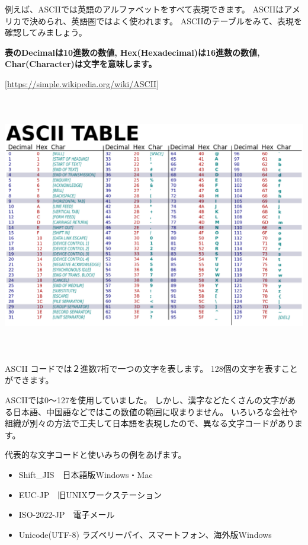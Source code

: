 \documentclass[a4paper,12pt,dvipdfmx]{jarticle}
\begin{document}
例えば、ASCIIでは英語のアルファベットをすべて表現できます。
ASCIIはアメリカで決められ、英語圏ではよく使われます。
ASCIIのテーブルをみて、表現を確認してみましょう。


\bigskip

{\bfseries
表のDecimalは10進数の数値,
Hex(Hexadecimal)は16進数の数値,
Char(Character)は文字を意味します。}


\bigskip

[\url{https://simple.wikipedia.org/wiki/ASCII}]

\begin{center}
\includegraphics[width=17.006cm,height=11.317cm]{textbook-img016.eps}

\end{center}
ASCII
コードでは２進数7桁で一つの文字を表します。
128個の文字を表すことができます。


\bigskip


\bigskip


\bigskip

\clearpage
ASCIIでは0〜127を使用していました。
しかし、漢字などたくさんの文字がある日本語、中国語などではこの数値の範囲に収まりません。
いろいろな会社や組織が別々の方法で工夫して日本語を表現したので、異なる文字コードがあります。

代表的な文字コードと使いみちの例をあげます。

\begin{itemize}
\item Shift\_JIS　日本語版Windows・Mac
\item EUC-JP　旧UNIXワークステーション
\item ISO-2022-JP　電子メール
\item Unicode(UTF-8)
ラズベリーパイ、スマートフォン、海外版Windows


\bigskip
\end{itemize}
\end{document}
